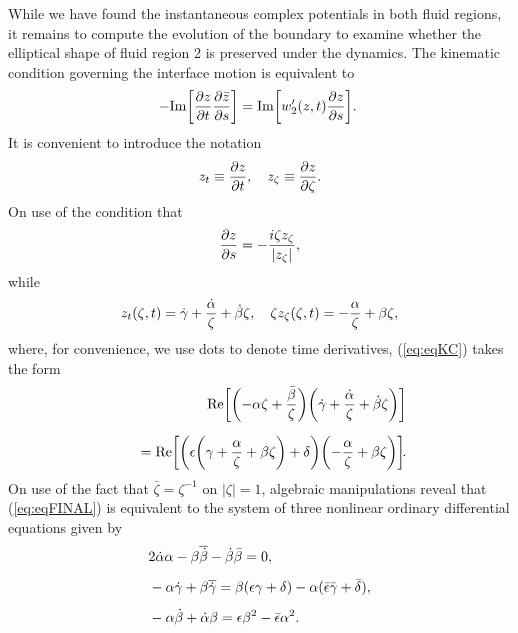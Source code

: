\documentclass[fleqn]{jleo}
\begin{document}
While we have  found the instantaneous complex potentials in both fluid regions,
it remains to compute the evolution of the boundary to examine whether the
elliptical shape of fluid region 2 is preserved under the dynamics. The kinematic
condition governing the interface motion is equiva\-lent to 
\begin{equation}
\hspace*{-3pt}-{\rm Im}{\left[{\partial z \over \partial t} {\partial \bar z \over 
\partial s} \right]}
= {\rm Im}{\left[w_2'(z,t) {\partial z \over \partial s} \right]}.\label{eq:eqKC}
\end{equation}
It is convenient to introduce the notation
\begin{equation}
z_t \equiv {\partial z \over \partial t}, \quad
z_\zeta \equiv {\partial z \over \partial \zeta}.
\end{equation}
On use of the condition that 
\begin{equation}
{\partial z \over \partial s} = -{i \zeta z_\zeta \over |z_\zeta|},
\end{equation}
while
\begin{equation}
z_t(\zeta,t) = \dot \gamma + {\dot \alpha \over \zeta} + \dot \beta \zeta,
\quad  \zeta z_\zeta(\zeta,t) = -{ \alpha \over \zeta} + \beta \zeta,
\end{equation}
where, for convenience, we use dots to denote time derivatives,
(\ref{eq:eqKC})
takes the form\vspace*{3pt}
\begin{eqnarray}
&&\displaystyle {\rm Re} {\left[{\left( -\alpha \zeta +{\bar \beta \over \zeta} \right )}
{\left(\dot \gamma + {\dot \alpha \over \zeta} + \dot \beta \zeta
\right)}\right]}\notag\\[6pt]
&&\quad = {\rm Re} {\left[{\left(\epsilon
{\left (\gamma + { \alpha \over \zeta} + \beta \zeta
\right)} + \delta \right )}
{\left(-{\alpha \over \zeta} +{\beta \zeta} \right )}
 \right]}\!.\label{eq:eqFINAL}
\end{eqnarray}
On use of the fact that $\bar \zeta=\zeta^{-1}$
on $|\zeta|=1$, algebraic manipulations reveal
that (\ref{eq:eqFINAL}) is equivalent to the 
system of three nonlinear ordinary differential equations given by
\begin{align}
&\displaystyle 2 \dot \alpha \alpha - \beta \overline{\dot \beta} - \dot \beta \bar \beta =0, \notag\\[5pt]
&\displaystyle -\alpha \dot \gamma + \beta \overline{\dot \gamma} = \beta (\epsilon \gamma
+ \delta) - \alpha (\bar \epsilon \bar \gamma + \bar \delta), \notag\\[5pt]
&\displaystyle -\alpha \dot \beta + \dot \alpha \beta = \epsilon \beta^2 - \bar \epsilon\alpha^2.
\label{eq:eqD3}
\end{align}
\end{document}
